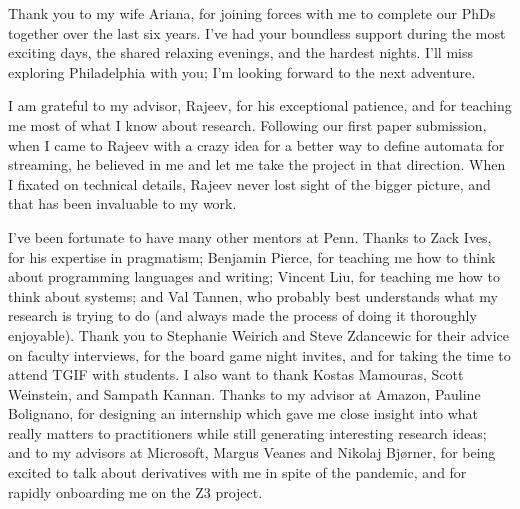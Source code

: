Thank you to my wife Ariana, for joining forces with me to complete our PhDs together over the last six years.
I've had your boundless support during the most exciting days, the shared relaxing evenings, and the hardest nights.
I'll miss exploring Philadelphia with you; I'm looking forward to the next adventure.

I am grateful to my advisor, Rajeev, for his exceptional patience, and for teaching me most of what I know about research.
Following our first paper submission, when I came to Rajeev with a crazy idea for a better way to define automata for streaming, he believed in me and let me take the project in that direction.
When I fixated on technical details, Rajeev never lost sight of the bigger picture, and that has been invaluable to my work.

I've been fortunate to have many other mentors at Penn. Thanks to Zack Ives, for his expertise in pragmatism; Benjamin Pierce, for teaching me how to think about programming languages and writing; Vincent Liu, for teaching me how to think about systems; and Val Tannen, who probably best understands what my research is trying to do (and always made the process of doing it thoroughly enjoyable).
Thank you to Stephanie Weirich and Steve Zdancewic for their advice on faculty interviews, for the board game night invites, and for taking the time to attend TGIF with students.
I also want to thank Kostas Mamouras, Scott Weinstein, and Sampath Kannan.
Thanks to my advisor at Amazon, Pauline Bolignano, for designing an internship which gave me close insight into what really matters to practitioners while still generating interesting research ideas; and to my advisors at Microsoft, Margus Veanes and Nikolaj Bjørner,
for being excited to talk about derivatives with me in spite of the pandemic, and for rapidly onboarding me on the Z3 project.

